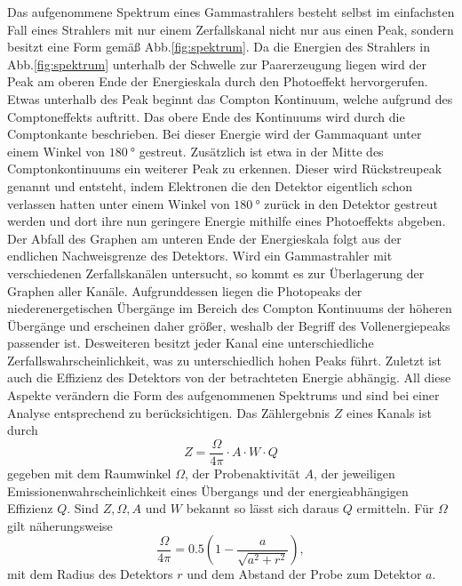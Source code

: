 Das aufgenommene Spektrum eines Gammastrahlers besteht selbst im einfachsten Fall eines Strahlers mit nur einem Zerfallskanal nicht nur aus einen Peak, sondern besitzt eine Form gemäß Abb.\ref{fig:spektrum}. Da die Energien des Strahlers in Abb.\ref{fig:spektrum} unterhalb der Schwelle zur Paarerzeugung liegen wird der Peak am oberen Ende der Energieskala durch den Photoeffekt hervorgerufen. Etwas unterhalb des Peak beginnt das Compton Kontinuum, welche aufgrund des Comptoneffekts auftritt. Das obere Ende des Kontinuums wird durch die Comptonkante beschrieben. Bei dieser Energie wird der Gammaquant unter einem Winkel von $\SI{180}{\degree}$ gestreut. Zusätzlich ist etwa in der Mitte des Comptonkontinuums ein weiterer Peak zu erkennen. Dieser wird Rückstreupeak genannt und entsteht, indem Elektronen die den Detektor eigentlich schon verlassen hatten unter einem Winkel von $\SI{180}{\degree}$ zurück in den Detektor gestreut werden und dort ihre nun geringere Energie mithilfe eines Photoeffekts abgeben. Der Abfall des Graphen am unteren Ende der Energieskala folgt aus der endlichen Nachweisgrenze des Detektors. Wird ein Gammastrahler mit verschiedenen Zerfallskanälen untersucht, so kommt es zur Überlagerung der Graphen aller Kanäle. Aufgrunddessen liegen die Photopeaks der niederenergetischen Übergänge im Bereich des Compton Kontinuums der höheren Übergänge und erscheinen daher größer, weshalb der Begriff des Vollenergiepeaks passender ist. Desweiteren besitzt jeder Kanal eine unterschiedliche Zerfallswahrscheinlichkeit, was zu unterschiedlich hohen Peaks führt. Zuletzt ist auch die Effizienz des Detektors von der betrachteten Energie abhängig. All diese Aspekte verändern die Form des aufgenommenen Spektrums und sind bei einer Analyse entsprechend zu berücksichtigen. Das Zählergebnis $Z$ eines Kanals ist durch
\begin{equation}
    Z = \frac{\Omega}{4 \pi}\cdot A \cdot W \cdot Q
\end{equation}
gegeben mit dem Raumwinkel $\Omega$, der Probenaktivität $A$, der jeweiligen Emissionenwahrscheinlichkeit eines Übergangs und der energieabhängigen Effizienz $Q$. Sind $Z,\Omega,A$ und $W$ bekannt so lässt sich daraus $Q$ ermitteln. Für $\Omega$ gilt näherungsweise
\begin{equation}
    \frac{\Omega}{4 \pi} = 0.5 \left( 1- \frac{a}{\sqrt{a^2 + r^2}}\right) ,
\end{equation}
mit dem Radius des Detektors $r$ und dem Abstand der Probe zum Detektor $a$.  
